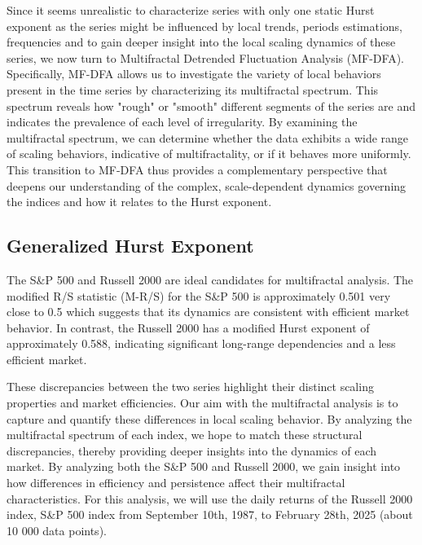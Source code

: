 \documentclass[11pt]{extarticle}
\begin{document}
Since it seems unrealistic to characterize series with only one static Hurst exponent as the series might be influenced by local trends,
periods estimations, frequencies and to gain deeper insight into the local scaling dynamics of these series, we now turn
to Multifractal Detrended Fluctuation Analysis (MF-DFA).
Specifically, MF-DFA allows us to investigate the variety of local behaviors present in the time series by characterizing its multifractal
spectrum. This spectrum reveals how "rough" or "smooth" different segments of the series are and indicates the prevalence of each level of
irregularity. By examining the multifractal spectrum, we can determine whether the data exhibits a wide range of scaling behaviors, indicative
of multifractality, or if it behaves more uniformly. This transition to MF-DFA thus provides a complementary perspective that deepens our understanding
of the complex, scale-dependent dynamics governing the indices and how it relates to the Hurst exponent.


\subsection{Generalized Hurst Exponent}
\label{subsec:gen_hurst}

The S\&P 500 and Russell 2000 are ideal candidates for multifractal analysis.
The modified R/S statistic (M-R/S) for the S\&P 500 is approximately 0.501 very close to 0.5 which suggests that its
dynamics are consistent with efficient market behavior. In contrast, the Russell 2000 has a modified Hurst exponent of
approximately 0.588, indicating significant long-range dependencies and a less efficient market.

These discrepancies between the two series highlight their distinct scaling properties and market efficiencies. Our aim with
the multifractal analysis is to capture and quantify these differences in local scaling behavior. By analyzing the multifractal spectrum
of each index, we hope to match these structural discrepancies, thereby providing deeper insights into the dynamics of each market.
By analyzing both the S\&P 500 and Russell 2000, we gain insight into how differences in efficiency and persistence
affect their multifractal characteristics.
For this analysis, we will use the daily returns of the Russell 2000 index, S\&P 500 index from September 10th, 1987, to February 28th, 2025 (about 10 000 data points).
\end{document}
